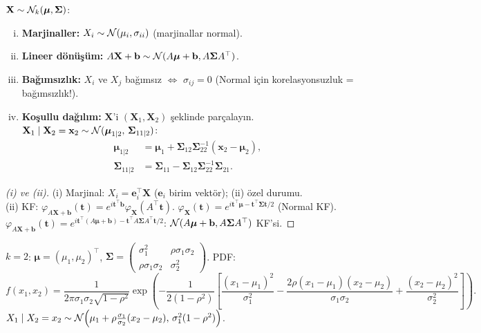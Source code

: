 \begin{teorem}
\label{thm:cb_normal}
$\mathbf{X} \sim \mathcal{N}_k(\boldsymbol{\mu}, \boldsymbol{\Sigma})$:
\begin{enumerate}[(i)]
  \item \textbf{Marjinaller:} $X_i \sim \mathcal{N}(\mu_i, \sigma_{ii})$ (marjinallar normal).
  \item \textbf{Lineer dönüşüm:} $A\mathbf{X} + \mathbf{b} \sim \mathcal{N}(A\boldsymbol{\mu}+\mathbf{b}, A\boldsymbol{\Sigma}A^\top)$.
  \item \textbf{Bağımsızlık:} $X_i$ ve $X_j$ bağımsız $\Leftrightarrow$ $\sigma_{ij} = 0$ (Normal için korelasyonsuzluk = bağımsızlık!).
  \item \textbf{Koşullu dağılım:} $\mathbf{X}$'i $(\mathbf{X}_1, \mathbf{X}_2)$ şeklinde parçalayın.
  $\mathbf{X}_1 \mid \mathbf{X}_2 = \mathbf{x}_2 \sim \mathcal{N}(\boldsymbol{\mu}_{1|2},\, \boldsymbol{\Sigma}_{11|2})$:
  \begin{align*}
    \boldsymbol{\mu}_{1|2} &= \boldsymbol{\mu}_1 + \boldsymbol{\Sigma}_{12}\boldsymbol{\Sigma}_{22}^{-1}(\mathbf{x}_2 - \boldsymbol{\mu}_2),\\
    \boldsymbol{\Sigma}_{11|2} &= \boldsymbol{\Sigma}_{11} - \boldsymbol{\Sigma}_{12}\boldsymbol{\Sigma}_{22}^{-1}\boldsymbol{\Sigma}_{21}.
  \end{align*}
\end{enumerate}
\end{teorem}

\begin{proof}[(i) ve (ii)]
(i) Marjinal: $X_i = \mathbf{e}_i^\top \mathbf{X}$ ($\mathbf{e}_i$ birim vektör); (ii) özel durumu.\\
(ii) KF: $\varphi_{A\mathbf{X}+\mathbf{b}}(\mathbf{t}) = e^{i\mathbf{t}^\top \mathbf{b}} \varphi_{\mathbf{X}}(A^\top \mathbf{t})$.
$\varphi_{\mathbf{X}}(\mathbf{t}) = e^{i\mathbf{t}^\top\boldsymbol{\mu} - \mathbf{t}^\top\boldsymbol{\Sigma}\mathbf{t}/2}$ (Normal KF).
$\varphi_{A\mathbf{X}+\mathbf{b}}(\mathbf{t}) = e^{i\mathbf{t}^\top(A\boldsymbol{\mu}+\mathbf{b}) - \mathbf{t}^\top A\boldsymbol{\Sigma}A^\top\mathbf{t}/2}$: $\mathcal{N}(A\boldsymbol{\mu}+\mathbf{b}, A\boldsymbol{\Sigma}A^\top)$ KF'si.
\end{proof}

\begin{ornek}
$k=2$: $\boldsymbol{\mu} = (\mu_1, \mu_2)^\top$,
$\boldsymbol{\Sigma} = \begin{pmatrix}\sigma_1^2 & \rho\sigma_1\sigma_2 \\ \rho\sigma_1\sigma_2 & \sigma_2^2\end{pmatrix}$.
PDF:
\[
  f(x_1,x_2) = \frac{1}{2\pi\sigma_1\sigma_2\sqrt{1-\rho^2}}
  \exp\!\left(-\frac{1}{2(1-\rho^2)}\left[\frac{(x_1-\mu_1)^2}{\sigma_1^2}
  - \frac{2\rho(x_1-\mu_1)(x_2-\mu_2)}{\sigma_1\sigma_2}
  + \frac{(x_2-\mu_2)^2}{\sigma_2^2}\right]\right).
\]
$X_1 \mid X_2 = x_2 \sim \mathcal{N}\!\left(\mu_1 + \rho\frac{\sigma_1}{\sigma_2}(x_2-\mu_2),\,
\sigma_1^2(1-\rho^2)\right)$.
\end{ornek}

